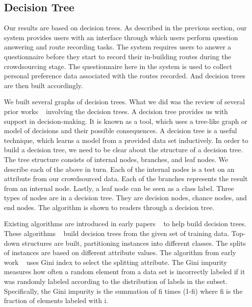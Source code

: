 \documentclass{sigchi}
\begin{document}
\subsection{Decision Tree}

Our results are based on decision trees. As described in the previous section, our system provides users with an interface through which users perform question answering and route recording tasks. The system requires users to answer a questionnaire before they start to record their in-building routes during the crowdsourcing stage. The questionnaire here in the system is used to collect personal preference data associated with the routes recorded. And decision trees are then built accordingly. 


We built several graphs of decision trees. What we did was the review of several prior works ~\cite{su2006fast,quinlan1987simplifying} involving the decision trees. A decision tree provides us with support in decision-making. It is known as a tool, which uses a tree-like graph or model of decisions and their possible consequences. A decision tree is a useful technique, which learns a model from a provided data set inductively. In order to build a decision tree, we need to be clear about the structure of a decision tree. The tree structure consists of internal nodes, branches, and leaf nodes. We describe each of the above in turn. Each of the internal nodes is a test on an attribute from our crowdsourced data. Each of the branches represents the result from an internal node. Lastly, a leaf node can be seen as a class label. Three types of nodes are in a decision tree. They are decision nodes, chance nodes, and end nodes. The algorithm is shown to readers through a decision tree. 


Existing algorithms are introduced in early papers ~\cite{breiman1984classification,quinlan1986induction} to help build decision trees. These algorithms ~\cite{breiman1984classification,quinlan1986induction} build decision trees from the given set of training data. Top-down structures are built, partitioning instances into different classes. The splits of instances are based on different attribute values. The algorithm from early work ~\cite{breiman1984classification} uses Gini index to select the splitting attribute. The Gini impurity measures how often a random element from a data set is incorrectly labeled if it was randomly labeled according to the distribution of labels in the subset. Specifically, the Gini impurity is the summation of fi times (1-fi) where fi is the fraction of elements labeled with i.
\end{document}
